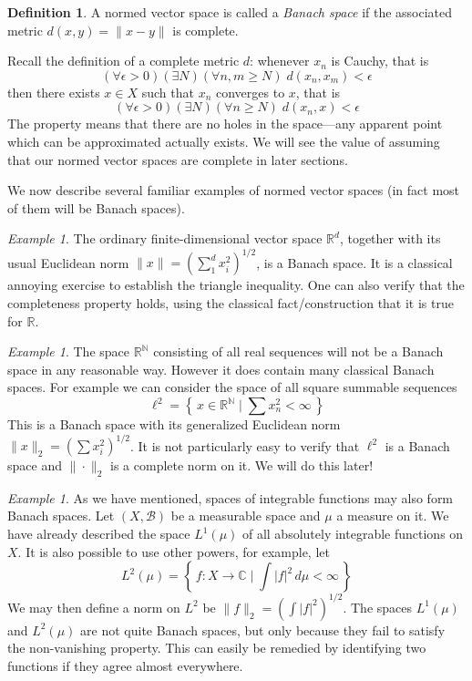 \documentclass[11pt,oneside]{amsbook}
\newcommand{\set}[1]{\left\{\,#1\,\right\}}
\newcommand{\NN}{{\mathbb N}}
\newcommand{\RR}{{\mathbb R}}
\newcommand{\CC}{{\mathbb C}}
\theoremstyle{definition}
\theoremstyle{plain}
\theoremstyle{definition}
\newtheorem{defn}[thm]{Definition}
\theoremstyle{remark}
\newtheorem{example}[thm]{Example}
\numberwithin{equation}{section}
\numberwithin{figure}{section}
\begin{document}
\begin{defn}
  A normed vector space is called a \emph{Banach space} if the associated metric $d(x,y)=\|x-y\|$ is complete.
\end{defn}

Recall the definition of a complete metric $d$: whenever $x_n$ is Cauchy, that is
\[(\forall\epsilon>0)(\exists N)(\forall n,m\geq N)\;d(x_n,x_m)<\epsilon
\]
then there exists $x\in X$ such that $x_n$ converges to $x$, that is
\[(\forall\epsilon>0)(\exists N)(\forall n\geq N)\;d(x_n,x)<\epsilon
\]
The property means that there are no holes in the space---any apparent point which can be approximated actually exists. We will see the value of assuming that our normed vector spaces are complete in later sections.

We now describe several familiar examples of normed vector spaces (in fact most of them will be Banach spaces).

\begin{example}
  The ordinary finite-dimensional vector space $\RR^d$, together with its usual Euclidean norm $\|x\|=\left(\sum_1^dx_i^2\right)^{1/2}$, is a Banach space. It is a classical annoying exercise to establish the triangle inequality. One can also verify that the completeness property holds, using the classical fact/construction that it is true for $\RR$.
\end{example}

\begin{example}
  The space $\RR^\NN$ consisting of all real sequences will not be a Banach space in any reasonable way. However it does contain many classical Banach spaces. For example we can consider the space of all square summable sequences
  \[\ell^2=\set{x\in\RR^\NN\mid\sum x_n^2<\infty}
  \]
  This is a Banach space with its generalized Euclidean norm $\|x\|_2=\left(\sum x_i^2\right)^{1/2}$. It is not particularly easy to verify that $\ell^2$ is a Banach space and $\|\cdot\|_2$ is a complete norm on it. We will do this later!
\end{example}

\begin{example}
  As we have mentioned, spaces of integrable functions may also form Banach spaces. Let $(X,\mathcal B)$ be a measurable space and $\mu$ a measure on it. We have already described the space $L^1(\mu)$ of all absolutely integrable functions on $X$. It is also possible to use other powers, for example, let
  \[L^2(\mu)=\set{f\colon X\to\CC\mid \int|f|^2\,d\mu<\infty}
  \]
  We may then define a norm on $L^2$ be $\|f\|_2=\left(\int|f|^2\right)^{1/2}$. The spaces $L^1(\mu)$ and $L^2(\mu)$ are not quite Banach spaces, but only because they fail to satisfy the non-vanishing property. This can easily be remedied by identifying two functions if they agree almost everywhere.
\end{example}
\end{document}
